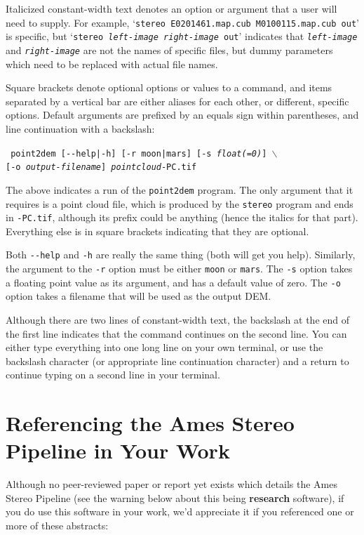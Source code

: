 Italicized constant-width text denotes an option or argument that
a user will need to supply.  For example, `\texttt{stereo E0201461.map.cub
M0100115.map.cub out}' is specific, but `\texttt{stereo \textit{left-image
right-image} out}' indicates that \texttt{\textit{left-image}} and
\texttt{\textit{right-image}} are not the names of specific files,
but dummy parameters which need to be replaced with actual file
names.

Square brackets denote optional options or values to a command, and
items separated by a vertical bar are either aliases for each other, or
different, specific options.  Default arguments are prefixed by an equals
sign within parentheses, and line continuation with a backslash:

\texttt{  point2dem [-\/-help|-h] [-r moon|mars] [-s \textit{float(=0)}] $\backslash$ } \\
\hspace*{6em}\texttt{[-o \textit{output-filename}] \textit{pointcloud}-PC.tif}

The above indicates a run of the \texttt{point2dem} program.  The
only argument that it requires is a point cloud file, which is
produced by the \texttt{stereo} program and ends in \texttt{-PC.tif},
although its prefix could be anything (hence the italics for that
part).  Everything else is in square brackets indicating that they
are optional.

Both \texttt{-\/-help} and \texttt{-h} are really the same thing (both
will get you help).  Similarly, the argument to the \texttt{-r}
option must be either \texttt{moon} or \texttt{mars}.  The \texttt{-s}
option takes a floating point value as its argument, and has a
default value of zero.  The \texttt{-o} option takes a filename
that will be used as the output \ac{DEM}.

Although there are two lines of constant-width text, the backslash at the end
of the first line indicates that the command continues on the second line.  You
can either type everything into one long line on your own terminal, or use the
backslash character (or appropriate line continuation character) and a return to
continue typing on a second line in your terminal.


\section{Referencing the Ames Stereo Pipeline in Your Work}

Although no peer-reviewed paper or report yet exists which details the
Ames Stereo Pipeline (see the warning below about this being {\bf
  research} software), if you do use this software in your work, we'd
appreciate it if you referenced one or more of these abstracts:

